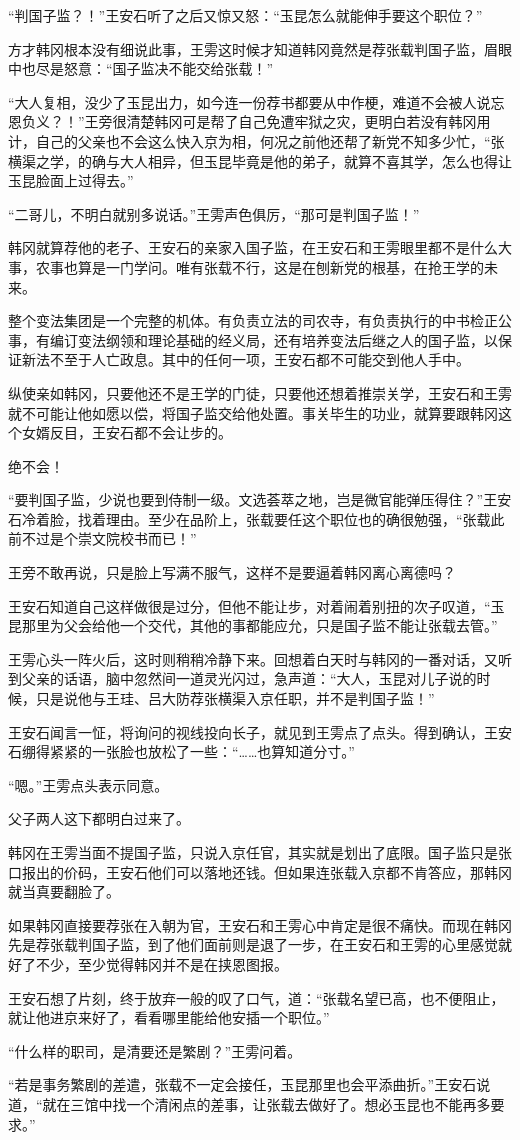“判国子监？！”王安石听了之后又惊又怒：“玉昆怎么就能伸手要这个职位？”

方才韩冈根本没有细说此事，王雱这时候才知道韩冈竟然是荐张载判国子监，眉眼中也尽是怒意：“国子监决不能交给张载！”

“大人复相，没少了玉昆出力，如今连一份荐书都要从中作梗，难道不会被人说忘恩负义？！”王旁很清楚韩冈可是帮了自己免遭牢狱之灾，更明白若没有韩冈用计，自己的父亲也不会这么快入京为相，何况之前他还帮了新党不知多少忙，“张横渠之学，的确与大人相异，但玉昆毕竟是他的弟子，就算不喜其学，怎么也得让玉昆脸面上过得去。”

“二哥儿，不明白就别多说话。”王雱声色俱厉，“那可是判国子监！”

韩冈就算荐他的老子、王安石的亲家入国子监，在王安石和王雱眼里都不是什么大事，农事也算是一门学问。唯有张载不行，这是在刨新党的根基，在抢王学的未来。

整个变法集团是一个完整的机体。有负责立法的司农寺，有负责执行的中书检正公事，有编订变法纲领和理论基础的经义局，还有培养变法后继之人的国子监，以保证新法不至于人亡政息。其中的任何一项，王安石都不可能交到他人手中。

纵使亲如韩冈，只要他还不是王学的门徒，只要他还想着推崇关学，王安石和王雱就不可能让他如愿以偿，将国子监交给他处置。事关毕生的功业，就算要跟韩冈这个女婿反目，王安石都不会让步的。

绝不会！

“要判国子监，少说也要到侍制一级。文选荟萃之地，岂是微官能弹压得住？”王安石冷着脸，找着理由。至少在品阶上，张载要任这个职位也的确很勉强，“张载此前不过是个崇文院校书而已！”

王旁不敢再说，只是脸上写满不服气，这样不是要逼着韩冈离心离德吗？

王安石知道自己这样做很是过分，但他不能让步，对着闹着别扭的次子叹道，“玉昆那里为父会给他一个交代，其他的事都能应允，只是国子监不能让张载去管。”

王雱心头一阵火后，这时则稍稍冷静下来。回想着白天时与韩冈的一番对话，又听到父亲的话语，脑中忽然间一道灵光闪过，急声道：“大人，玉昆对儿子说的时候，只是说他与王珪、吕大防荐张横渠入京任职，并不是判国子监！”

王安石闻言一怔，将询问的视线投向长子，就见到王雱点了点头。得到确认，王安石绷得紧紧的一张脸也放松了一些：“……也算知道分寸。”

“嗯。”王雱点头表示同意。

父子两人这下都明白过来了。

韩冈在王雱当面不提国子监，只说入京任官，其实就是划出了底限。国子监只是张口报出的价码，王安石他们可以落地还钱。但如果连张载入京都不肯答应，那韩冈就当真要翻脸了。

如果韩冈直接要荐张在入朝为官，王安石和王雱心中肯定是很不痛快。而现在韩冈先是荐张载判国子监，到了他们面前则是退了一步，在王安石和王雱的心里感觉就好了不少，至少觉得韩冈并不是在挟恩图报。

王安石想了片刻，终于放弃一般的叹了口气，道：“张载名望已高，也不便阻止，就让他进京来好了，看看哪里能给他安插一个职位。”

“什么样的职司，是清要还是繁剧？”王雱问着。

“若是事务繁剧的差遣，张载不一定会接任，玉昆那里也会平添曲折。”王安石说道，“就在三馆中找一个清闲点的差事，让张载去做好了。想必玉昆也不能再多要求。”

